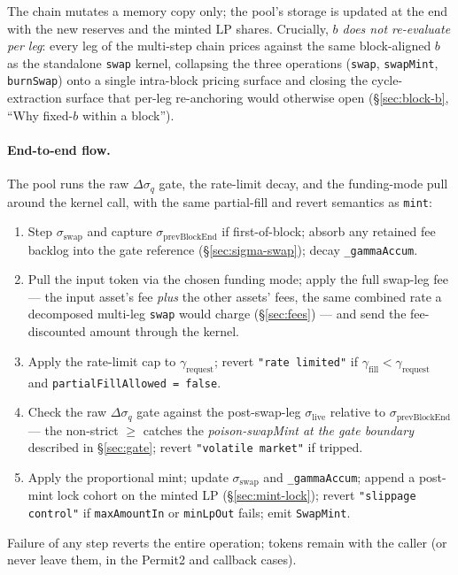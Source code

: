 \documentclass[11pt]{article}
\begin{document}
The chain mutates a memory copy only; the pool's storage is updated
at the end with the new reserves and the minted LP shares. Crucially,
\emph{$b$ does not re-evaluate per leg}: every leg of the multi-step
chain prices against the same block-aligned $b$ as the standalone
\texttt{swap} kernel, collapsing the three operations
(\texttt{swap}, \texttt{swapMint}, \texttt{burnSwap}) onto a single
intra-block pricing surface and closing the cycle-extraction surface
that per-leg re-anchoring would otherwise open
(\S\ref{sec:block-b}, ``Why fixed-$b$ within a block'').

\paragraph{End-to-end flow.}
The pool runs the raw $\Delta\sigma_q$ gate, the rate-limit decay, and the
funding-mode pull around the kernel call, with the same partial-fill
and revert semantics as \texttt{mint}:
\begin{enumerate}
  \item Step $\sigma_{\mathrm{swap}}$ and capture
        $\sigma_{\mathrm{prevBlockEnd}}$ if first-of-block; absorb any
        retained fee backlog into the gate reference
        (\S\ref{sec:sigma-swap}); decay \texttt{\_gammaAccum}.
  \item Pull the input token via the chosen funding mode; apply the
        full swap-leg fee --- the input asset's fee \emph{plus} the
        other assets' fees, the same combined rate a decomposed
        multi-leg \texttt{swap} would charge (\S\ref{sec:fees}) --- and
        send the fee-discounted amount through the kernel.
  \item Apply the rate-limit cap to $\gamma_{\mathrm{request}}$;
        revert \texttt{"rate limited"} if $\gamma_{\mathrm{fill}} <
        \gamma_{\mathrm{request}}$ and \texttt{partialFillAllowed =
        false}.
  \item Check the raw $\Delta\sigma_q$ gate against the post-swap-leg
        $\sigma_{\mathrm{live}}$ relative to
        $\sigma_{\mathrm{prevBlockEnd}}$ --- the non-strict $\ge$
        catches the \emph{poison-swapMint at the gate boundary}
        described in \S\ref{sec:gate}; revert \texttt{"volatile market"}
        if tripped.
  \item Apply the proportional mint; update $\sigma_{\mathrm{swap}}$
        and \texttt{\_gammaAccum}; append a post-mint lock cohort on the
        minted LP (\S\ref{sec:mint-lock}); revert
        \texttt{"slippage control"} if \texttt{maxAmountIn} or
        \texttt{minLpOut} fails; emit \texttt{SwapMint}.
\end{enumerate}
Failure of any step reverts the entire operation; tokens remain with
the caller (or never leave them, in the Permit2 and callback cases).
\end{document}
